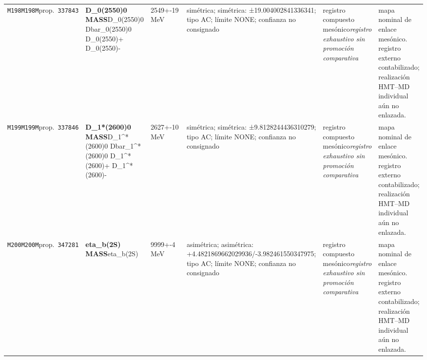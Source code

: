 \begin{landscape}
\begin{longtable}{L{1.85cm}L{4.45cm}L{2.35cm}L{4.05cm}L{3.35cm}L{7.15cm}}
\texttt{M198}\newline \texttt{M198M}\newline prop.\ \texttt{337843} & \textbf{D\_\allowbreak{}0(2550)0 MASS}\newline D\_\allowbreak{}0(2550)0 \textbar{}\allowbreak{} Dbar\_\allowbreak{}0(2550)0 \textbar{}\allowbreak{} D\_\allowbreak{}0(2550)+ \textbar{}\allowbreak{} D\_\allowbreak{}0(2550)- & 2549+-19\,MeV & simétrica; simétrica: ±19.004002841336341; tipo AC; límite NONE; confianza no consignado & registro compuesto mesónico\newline \emph{registro exhaustivo sin promoción comparativa} & mapa nominal de enlace mesónico. registro externo contabilizado; realización HMT--MD individual aún no enlazada. \\
\texttt{M199}\newline \texttt{M199M}\newline prop.\ \texttt{337846} & \textbf{D\_\allowbreak{}1*(2600)0 MASS}\newline D\_\allowbreak{}1\textasciicircum{}*(2600)0 \textbar{}\allowbreak{} Dbar\_\allowbreak{}1\textasciicircum{}*(2600)0 \textbar{}\allowbreak{} D\_\allowbreak{}1\textasciicircum{}*(2600)+ \textbar{}\allowbreak{} D\_\allowbreak{}1\textasciicircum{}*(2600)- & 2627+-10\,MeV & simétrica; simétrica: ±9.8128244436310279; tipo AC; límite NONE; confianza no consignado & registro compuesto mesónico\newline \emph{registro exhaustivo sin promoción comparativa} & mapa nominal de enlace mesónico. registro externo contabilizado; realización HMT--MD individual aún no enlazada. \\
\texttt{M200}\newline \texttt{M200M}\newline prop.\ \texttt{347281} & \textbf{eta\_\allowbreak{}b(2S) MASS}\newline eta\_\allowbreak{}b(2S) & 9999+-4\,MeV & asimétrica; asimétrica: +4.4821869662029936/-3.982461550347975; tipo AC; límite NONE; confianza no consignado & registro compuesto mesónico\newline \emph{registro exhaustivo sin promoción comparativa} & mapa nominal de enlace mesónico. registro externo contabilizado; realización HMT--MD individual aún no enlazada. \\

\end{longtable}
\end{landscape}
